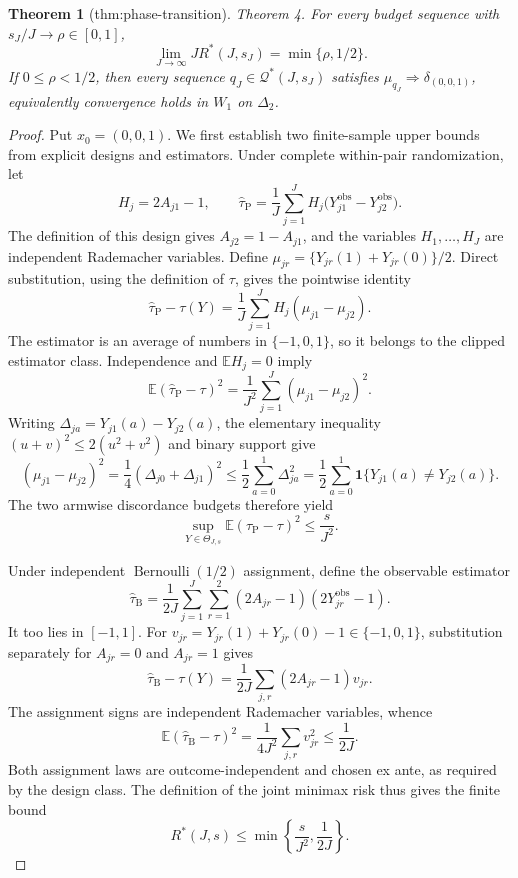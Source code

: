 \documentclass{article}
\newtheorem{theorem}{Theorem}
\begin{document}
\begin{theorem}[thm:phase-transition]\label{thm:phase-transition}
Theorem 4. For every budget sequence with \(s_J/J\to\rho\in[0,1]\), \[\lim_{J\to\infty}J R^*(J,s_J)=\min\{\rho,1/2\}.\] If \(0\le\rho<1/2\), then every sequence \(q_J\in\mathcal Q^*(J,s_J)\) satisfies \(\mu_{q_J}\Rightarrow\delta_{(0,0,1)}\), equivalently convergence holds in \(W_1\) on \(\Delta_2\).
\end{theorem}
\begin{proof}
Put \(x_0=(0,0,1)\).  We first establish two finite-sample upper bounds from explicit designs and estimators.  Under complete within-pair randomization, let
\[
 H_j=2A_{j1}-1,
 \qquad
 \widehat\tau_{\mathrm P}
 =\frac1J\sum_{j=1}^J
 H_j\bigl(Y^{\mathrm{obs}}_{j1}-Y^{\mathrm{obs}}_{j2}\bigr).
\]
The definition of this design gives \(A_{j2}=1-A_{j1}\), and the variables \(H_1,\ldots,H_J\) are independent Rademacher variables.  Define
\(
 \mu_{jr}=\{Y_{jr}(1)+Y_{jr}(0)\}/2
\).
Direct substitution, using the definition of \(\tau\), gives the pointwise identity
\[
 \widehat\tau_{\mathrm P}-\tau(Y)
 =\frac1J\sum_{j=1}^J H_j(\mu_{j1}-\mu_{j2}).
\]
The estimator is an average of numbers in \(\{-1,0,1\}\), so it belongs to the clipped estimator class.  Independence and \(\mathbb E H_j=0\) imply
\[
 \mathbb E(\widehat\tau_{\mathrm P}-\tau)^2
 =\frac1{J^2}\sum_{j=1}^J(\mu_{j1}-\mu_{j2})^2.
\]
Writing \(\Delta_{ja}=Y_{j1}(a)-Y_{j2}(a)\), the elementary inequality \((u+v)^2\le 2(u^2+v^2)\) and binary support give
\[
 (\mu_{j1}-\mu_{j2})^2
 =\frac14(\Delta_{j0}+\Delta_{j1})^2
 \le \frac12\sum_{a=0}^1\Delta_{ja}^2
 =\frac12\sum_{a=0}^1
 \mathbf 1\{Y_{j1}(a)\ne Y_{j2}(a)\}.
\]
The two armwise discordance budgets therefore yield
\[
 \sup_{Y\in\Theta_{J,s}}
 \mathbb E(\widehat\tau_{\mathrm P}-\tau)^2
 \le \frac{s}{J^2}.
\]

Under independent \(\operatorname{Bernoulli}(1/2)\) assignment, define the observable estimator
\[
 \widehat\tau_{\mathrm B}
 =\frac1{2J}\sum_{j=1}^J\sum_{r=1}^2
 (2A_{jr}-1)(2Y^{\mathrm{obs}}_{jr}-1).
\]
It too lies in \([-1,1]\).  For
\(
 v_{jr}=Y_{jr}(1)+Y_{jr}(0)-1\in\{-1,0,1\}
\), substitution separately for \(A_{jr}=0\) and \(A_{jr}=1\) gives
\[
 \widehat\tau_{\mathrm B}-\tau(Y)
 =\frac1{2J}\sum_{j,r}(2A_{jr}-1)v_{jr}.
\]
The assignment signs are independent Rademacher variables, whence
\[
 \mathbb E(\widehat\tau_{\mathrm B}-\tau)^2
 =\frac1{4J^2}\sum_{j,r}v_{jr}^2
 \le\frac1{2J}.
\]
Both assignment laws are outcome-independent and chosen ex ante, as required by the design class.  The definition of the joint minimax risk thus gives the finite bound
\[
 R^*(J,s)\le \min\left\{\frac{s}{J^2},\frac1{2J}\right\}.
 \tag{1}
\]


\end{proof}
\end{document}
